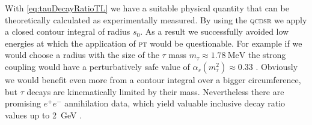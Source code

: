 \documentclass[../../index.tex]{subfiles}
\begin{document}
With \cref{eq:tauDecayRatioTL} we have a suitable physical quantity that can be
theoretically calculated as experimentally measured. By using the \textsc{qcdsr}
we apply a closed contour integral of radius \(s_0\). As a result we
successfully avoided low energies at which the application of \textsc{pt} would
be questionable. For example if we would choose a radius with the size of the
\(\tau\) mass \(m_\tau \approx \SI{1.78}{\mega\eV}\) the strong coupling would
have a perturbatively safe value of \(\alpha_s(m_\tau^2)\approx 0.33\)
\cite{Pich2016}. Obviously we would benefit even more from a contour integral
over a bigger circumference, but \(\tau\) decays are kinematically limited by
their mass. Nevertheless there are promising \(e^+e^-\) annihilation data, which
yield valuable inclusive decay ratio values up to \SI{2}{\giga\eV}
\cite{Boito2018}\cite{Keshavarzi2018}.
\end{document}
